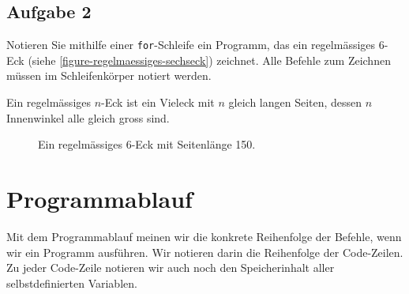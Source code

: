 \subsection{Aufgabe 2}

Notieren Sie mithilfe einer \lstinline{for}-Schleife ein Programm, das ein regelmässiges \num{6}-Eck (siehe \autoref{figure-regelmaessiges-sechseck}) zeichnet. Alle Befehle zum Zeichnen müssen im Schleifenkörper notiert werden.

\vspace{-0.25cm}

\begin{hinweis}
Ein regelmässiges $n$-Eck ist ein Vieleck mit $n$ gleich langen Seiten, dessen $n$ Innenwinkel alle gleich gross sind.
\end{hinweis}

\vspace{-0.25cm}

\begin{figure}[htb]
\centering
\begin{minipage}{0.55\textwidth}
\centering
\fillwithgrid{2in}
\end{minipage}
\hfill
\begin{minipage}{0.375\textwidth}
\centering
{}
\caption{Ein regelmässiges \num{6}-Eck mit Seitenlänge \num{150}.}
\label{figure-regelmaessiges-sechseck}
\end{minipage}
\end{figure}

\vspace{-0.5cm}

\section{Programmablauf}

Mit dem Programmablauf meinen wir die konkrete Reihenfolge der Befehle, wenn wir ein Programm ausführen. Wir notieren darin die Reihenfolge der Code-Zeilen. Zu jeder Code-Zeile notieren wir auch noch den Speicherinhalt aller selbstdefinierten Variablen.

